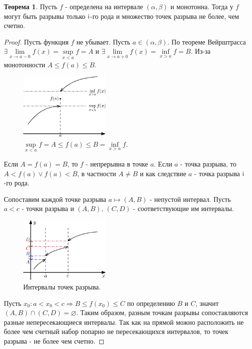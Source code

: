 \documentclass[12pt]{article}
\newcommand{\RN}[1]{%
	\textup{\uppercase\expandafter{\romannumeral#1}}%
}
\theoremstyle{definition}
\newtheorem{theorem}{Теорема}
\begin{document}
\begin{theorem}
	Пусть $f$ - определена на интервале $(\alpha, \beta)$ и монотонна. Тогда у $f$ могут быть разрывы только $\RN{1}$-го рода и множество точек разрыва не более, чем счетно.
\end{theorem}

\begin{proof}
Пусть функция $f$ не убывает. Пусть $a \in (\alpha,\beta)$. По теореме Вейрштрасса $\exists \! \! \lim\limits_{x \to a-0}f(x) = \sup\limits_{x<a}{f} = A$ и $\exists \! \! \lim\limits_{x \to a+0}f(x) = \inf\limits_{x>a}{f} = B$. Из-за монотонности $A \leq f(a) \leq B$.

\begin{figure}[H]
	\centering
	\includegraphics[width=0.4\textwidth]{17_6.eps}
	\caption{ $\sup\limits_{x<a}{f} = A \leq f(a) \leq B = \inf\limits_{x>a}{f}$.}
	\label{17_6}
\end{figure}

Если $A = f(a) = B$, то $f$ - непрерывна в точке $a$. Если $a$ - точка разрыва, то $A < f(a) \vee f(a) < B$, в частности $A \neq B$ и как следствие $a$ - точка разрыва  $\RN{1}$-го рода. 

Сопоставим каждой точке разрыва $a \mapsto (A,B)$ - непустой интервал. Пусть $a < c$ - точки разрыва и $(A,B), \, (C,D)$ - соответствующие им интервалы.

\begin{figure}[H]
	\centering
	\includegraphics[width=0.4\textwidth]{17_7.eps}
	\caption{ Интервалы точек разрыва.}
	\label{17_7}
\end{figure}

Пусть $x_0 \colon a < x_0 < c \Rightarrow B \leq f(x_0) \leq C$ по определению $B$ и $C$, значит $(A,B) \cap (C,D) = \varnothing$. Таким образом, разным точкам разрывы сопоставляются разные непересекающиеся интервалы. Так как на прямой можно расположить не более чем счетный набор попарно не пересекающихся интервалов, то точек разрыва - не более чем счетно.
\end{proof}
\end{document}

